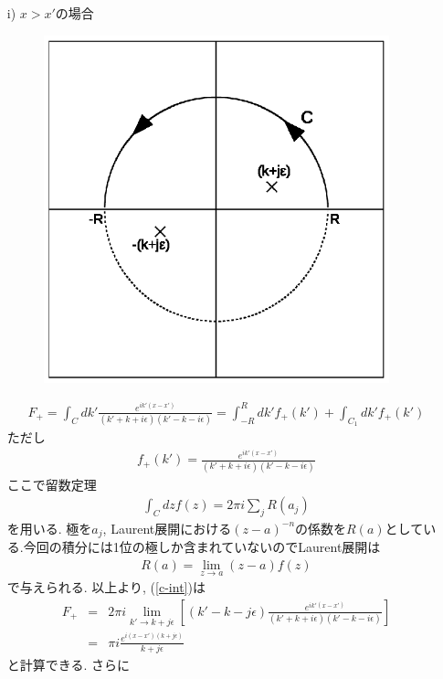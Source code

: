 \documentclass[10.5pt,a4paper]{jreport}
\begin{document}
\begin{itemize}
\item[i)] $x>x'$の場合
  \begin{figure}[htbp]
    \centering
    \includegraphics[width = 10cm]{./figure1new.eps}
    \label{fig1}
  \end{figure}
  \begin{eqnarray}
    F_+ = \int_{C} dk'\frac{e^{ik'(x-x')}}{(k'+k+i\epsilon)(k'-k-i\epsilon)} = \int_{-R}^Rdk' f_+(k') + \int_{C_1}dk'f_+(k')\label{c-int}
  \end{eqnarray}
  ただし
  \begin{eqnarray}
    f_+(k') = \frac{e^{ik'(x-x')}}{(k'+k+i\epsilon)(k'-k-i\epsilon)}
  \end{eqnarray}
  ここで留数定理
  \begin{eqnarray}
    \int_Cdz f(z) = 2\pi i\sum_j R(a_j)
  \end{eqnarray}
  を用いる. 極を$a_j$, Laurent展開における$(z-a)^{-n}$の係数を$R(a)$としている.今回の積分には1位の極しか含まれていないのでLaurent展開は
  \begin{eqnarray}
    R(a) = \lim_{z \rightarrow a}(z-a)f(z)
  \end{eqnarray}
  で与えられる. 以上より, (\ref{c-int})は
  \begin{eqnarray}
    F_+ &=& 2\pi i\lim_{k' \rightarrow k + j\epsilon }\left[(k'-k-j\epsilon)\frac{e^{ik'(x-x')}}{(k'+k+i\epsilon)(k'-k-i\epsilon)}\right]\\
    &=& \pi i\frac{e^{i(x-x')(k+j\epsilon)}}{k+j\epsilon}
  \end{eqnarray}
  と計算できる. さらに
  \begin{eqnarray}

\end{eqnarray}
\end{itemize}
\end{document}

